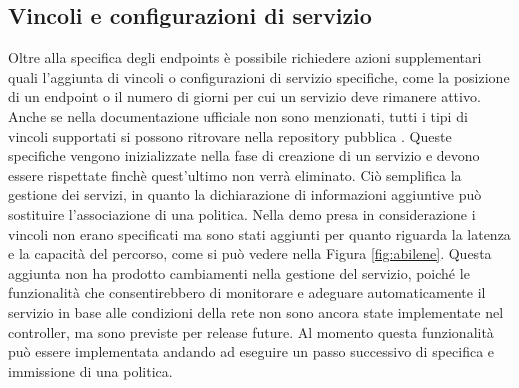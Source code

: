 \subsection{Vincoli e configurazioni di servizio}
Oltre alla specifica degli endpoints è possibile richiedere azioni supplementari quali l'aggiunta di vincoli o configurazioni di servizio specifiche, 
come la posizione di un endpoint o il numero di giorni per cui un servizio deve rimanere attivo. 
Anche se nella documentazione ufficiale non sono menzionati, tutti i tipi di vincoli supportati 
si possono ritrovare nella repository pubblica \cite{vincoli}.
\newline Queste specifiche vengono inizializzate nella fase di creazione di un servizio e devono essere rispettate finchè quest'ultimo non verrà eliminato. 
Ciò semplifica la gestione dei servizi, in quanto la dichiarazione di informazioni aggiuntive può sostituire l'associazione di una politica.
\newline Nella demo presa in considerazione i vincoli non erano specificati ma sono stati aggiunti per quanto riguarda la latenza e la capacità del percorso, 
come si può vedere nella Figura \ref{fig:abilene}.
Questa aggiunta non ha prodotto cambiamenti nella gestione del servizio,
poiché le funzionalità che consentirebbero di monitorare e adeguare automaticamente il servizio 
in base alle condizioni della rete non sono ancora state implementate nel controller, ma sono previste per release future.
Al momento questa funzionalità può essere implementata andando ad eseguire un passo successivo di specifica e immissione di una politica.

